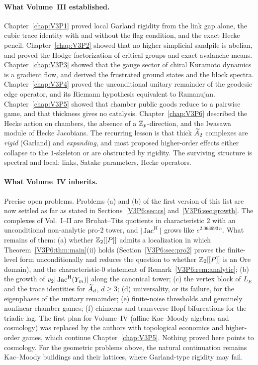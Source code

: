 \paragraph{What Volume~III established.} Chapter~\ref{chap:V3P1} proved local Garland rigidity from the link gap
alone, the cubic trace identity with and without the flag condition, and the exact Hecke
pencil. Chapter~\ref{chap:V3P2} showed that no higher simplicial sandpile is abelian, and proved the Hodge
factorization of critical groups and exact avalanche means. Chapter~\ref{chap:V3P3} showed that the gauge
sector of chiral Kuramoto dynamics is a gradient flow, and derived the frustrated ground
states and the block spectra. Chapter~\ref{chap:V3P4} proved the unconditional unitary remainder of the geodesic
edge operator, and its Riemann hypothesis equivalent to Ramanujan. Chapter~\ref{chap:V3P5} showed that chamber
public goods reduce to a pairwise game, and that thickness gives no catalysis. Chapter~\ref{chap:V3P6} described
the Hecke action on chambers, the absence of a $\mathbb{Z}_p$-direction, and the Iwasawa module of Hecke
Jacobians. The recurring lesson is that thick $\widetilde A_2$ complexes are \emph{rigid} (Garland) and
\emph{expanding}, and most proposed higher-order effects either collapse to the $1$-skeleton or
are obstructed by rigidity. The surviving structure is spectral and local: links, Satake
parameters, Hecke operators.

\paragraph{What Volume~IV inherits.} Precise open problems. Problems (a) and (b) of the first
version of this list are now settled as far as stated in Sections~\ref{V3P6:sec:cs}
and~\ref{V3P6:sec:growth}. The complexes of Vol.~I--II are Bruhat--Tits quotients in
characteristic $2$ with an unconditional non-analytic pro-$2$ tower, and $|\operatorname{Jac}^{\mathrm{H}}|$ grows like
$e^{2.063693\,n}$. What remains of them:
(a) whether $\mathbb{Z}_2[[P]]$ admits a localization in which Theorem~\ref{V3P6:thm:main}(ii) holds
(Section~\ref{V3P6:sec:pro2} proves the finite-level form unconditionally and reduces the question
to whether $\mathbb{Z}_2[[P]]$ is an Ore domain), and the characteristic-$0$ statement of
Remark~\ref{V3P6:rem:analytic};
(b) the growth of $v_2|\operatorname{Jac}^{\mathrm{H}}(Y_m)|$ along the canonical tower;
(c) the vertex block of $L_E$ and the trace identities for $\widetilde A_{d}$, $d\ge3$;
(d) universality, or its failure, for the eigenphases of the unitary remainder;
(e) finite-noise thresholds and genuinely nonlinear chamber games;
(f) chimeras and transverse Hopf bifurcations for the triadic lag.
The first plan for Volume~IV (affine Kac--Moody algebras and cosmology) was replaced by the
authors with topological economics and higher-order games, which continue Chapter~\ref{chap:V3P5}. Nothing
proved here points to cosmology. For the geometric problems above, the natural continuation
remains Kac--Moody buildings and their lattices, where Garland-type rigidity may fail.

